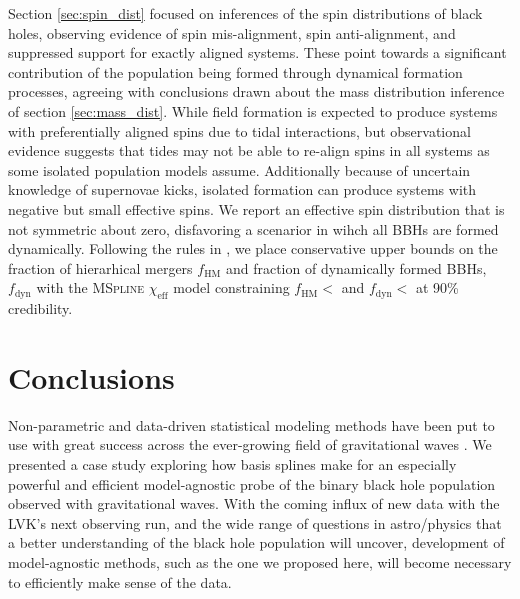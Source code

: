 Section \ref{sec:spin_dist} focused on inferences of the spin distributions of black holes, observing evidence of spin mis-alignment, spin anti-alignment, and suppressed support 
for exactly aligned systems. These point towards a significant contribution of the population being formed through dynamical formation processes, agreeing with 
conclusions drawn about the mass distribution inference of section \ref{sec:mass_dist}. While field formation is expected to produce systems with preferentially 
aligned spins due to tidal interactions, but observational evidence suggests that tides may not be able to re-align spins in all systems as some 
isolated population models assume. Additionally because of uncertain knowledge of supernovae kicks, isolated formation can produce systems with negative but small effective spins. 
We report an effective spin distribution that is not symmetric about zero, disfavoring a scenarior in wihch all BBHs are formed dynamically. Following the rules in \citet{Fishbach_2022}, 
we place conservative upper bounds on the fraction of hierarhical mergers $f_\mathrm{HM}$ and fraction of dynamically formed BBHs, $f_\mathrm{dyn}$ with 
the \textsc{MSpline} $\chi_\mathrm{eff}$ model constraining $f_\mathrm{HM} < $\result{$\macros[ChiEffective][chieff][frac_hm][10th percentile]$} 
and $f_\mathrm{dyn} < $ at 90\% credibility. 

\section{Conclusions}\label{sec:conclusion}

Non-parametric and data-driven statistical modeling methods have been put to use with great success across the ever-growing field of gravitational 
waves \citep{B_Farr_etal_2014,Littenberg_2015,MaMandel_2016,Edwards_2018,Doctor_GPR,Edelman_2021,Vitale_2021,Tiwari_2021_a,Tiwari_2021_b,Edelman_2022ApJ,Tiwari_2022ApJ}. 
We presented a case study exploring how basis splines make for an especially powerful and efficient model-agnostic probe of the binary black hole population observed 
with gravitational waves. With the coming influx of new data with the LVK's next observing run, and the wide range of questions in astro/physics that a better 
understanding of the black hole population will uncover, development of model-agnostic methods, such as the one we proposed here, will become necessary to efficiently make
sense of the data.  
